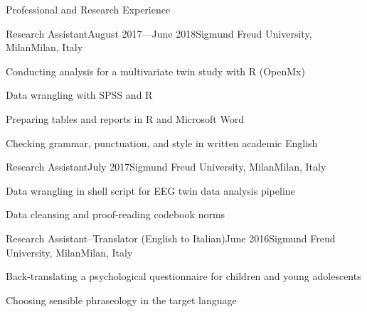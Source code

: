 \documentclass{resume2} %
\begin{document}
\begin{rSection}{Professional and Research Experience}



\begin{rSubsection}{Research Assistant}{August 2017---June 2018}{Sigmund Freud University, Milan}{Milan, Italy}
\item Conducting analysis for a multivariate twin study with R (OpenMx)
\item Data wrangling with SPSS and R%
\item Preparing tables and reports in R and Microsoft Word
\item Checking grammar, punctuation, and style in written academic English
\end{rSubsection}

\begin{rSubsection}{Research Assistant}{July 2017}{Sigmund Freud University, Milan}{Milan, Italy}
\item Data wrangling in shell script for EEG twin data analysis pipeline
\item Data cleansing and proof-reading codebook norms
\end{rSubsection}

\begin{rSubsection}{Research Assistant--Translator (English to Italian)}{June 2016}{Sigmund Freud University, Milan}{Milan, Italy}
\item Back-translating a psychological questionnaire for children and young adolescents
\item Choosing sensible phraseology in the target language
\end{rSubsection}

\end{rSection}

\end{document}
